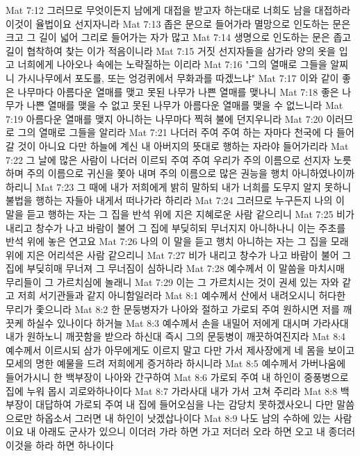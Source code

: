 Mat 7:12  그러므로 무엇이든지 남에게 대접을 받고자 하는대로 너희도 남을 대접하라 이것이 율법이요 선지자니라
Mat 7:13  좁은 문으로 들어가라 멸망으로 인도하는 문은 크고 그 길이 넓어 그리로 들어가는 자가 많고
Mat 7:14  생명으로 인도하는 문은 좁고 길이 협착하여 찾는 이가 적음이니라
Mat 7:15  거짓 선지자들을 삼가라 양의 옷을 입고 너희에게 나아오나 속에는 노략질하는 이리라
Mat 7:16  "그의 열매로 그들을 알찌니 가시나무에서 포도를, 또는 엉겅퀴에서 무화과를 따겠느냐"
Mat 7:17  이와 같이 좋은 나무마다 아름다운 열매를 맺고 못된 나무가 나쁜 열매를 맺나니
Mat 7:18  좋은 나무가 나쁜 열매를 맺을 수 없고 못된 나무가 아름다운 열매를 맺을 수 없느니라
Mat 7:19  아름다운 열매를 맺지 아니하는 나무마다 찍혀 불에 던지우니라
Mat 7:20  이러므로 그의 열매로 그들을 알리라
Mat 7:21  나더러 주여 주여 하는 자마다 천국에 다 들어갈 것이 아니요 다만 하늘에 계신 내 아버지의 뜻대로 행하는 자라야 들어가리라
Mat 7:22  그 날에 많은 사람이 나더러 이르되 주여 주여 우리가 주의 이름으로 선지자 노릇하며 주의 이름으로 귀신을 쫓아 내며 주의 이름으로 많은 권능을 행치 아니하였나이까 하리니
Mat 7:23  그 때에 내가 저희에게 밝히 말하되 내가 너희를 도무지 알지 못하니 불법을 행하는 자들아 내게서 떠나가라 하리라
Mat 7:24  그러므로 누구든지 나의 이 말을 듣고 행하는 자는 그 집을 반석 위에 지은 지혜로운 사람 같으리니
Mat 7:25  비가 내리고 창수가 나고 바람이 불어 그 집에 부딪히되 무너지지 아니하나니 이는 주초를 반석 위에 놓은 연고요
Mat 7:26  나의 이 말을 듣고 행치 아니하는 자는 그 집을 모래 위에 지은 어리석은 사람 같으리니
Mat 7:27  비가 내리고 창수가 나고 바람이 불어 그 집에 부딪히매 무너져 그 무너짐이 심하니라
Mat 7:28  예수께서 이 말씀을 마치시매 무리들이 그 가르치심에 놀래니
Mat 7:29  이는 그 가르치시는 것이 권세 있는 자와 같고 저희 서기관들과 같지 아니함일러라
Mat 8:1  예수께서 산에서 내려오시니 허다한 무리가 좇으니라
Mat 8:2  한 문둥병자가 나아와 절하고 가로되 주여 원하시면 저를 깨끗케 하실수 있나이다 하거늘
Mat 8:3  예수께서 손을 내밀어 저에게 대시며 가라사대 내가 원하노니 깨끗함을 받으라 하신대 즉시 그의 문둥병이 깨끗하여진지라
Mat 8:4  예수께서 이르시되 삼가 아무에게도 이르지 말고 다만 가서 제사장에게 네 몸을 보이고 모세의 명한 예물을 드려 저희에게 증거하라 하시니라
Mat 8:5  예수께서 가버나움에 들어가시니 한 백부장이 나아와 간구하여
Mat 8:6  가로되 주여 내 하인이 중풍병으로 집에 누워 몹시 괴로와하나이다
Mat 8:7  가라사대 내가 가서 고쳐 주리라
Mat 8:8  백부장이 대답하여 가로되 주여 내 집에 들어오심을 나는 감당치 못하겠사오니 다만 말씀으로만 하옵소서 그러면 내 하인이 낫겠삽나이다
Mat 8:9  나도 남의 수하에 있는 사람이요 내 아래도 군사가 있으니 이더러 가라 하면 가고 저더러 오라 하면 오고 내 종더러 이것을 하라 하면 하나이다
